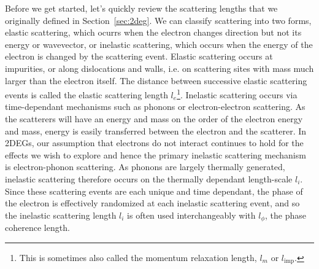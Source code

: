 Before we get started, let's quickly review the scattering lengths that we originally defined in Section~\ref{sec:2deg}. We can classify
scattering into two forms, elastic scattering, which ocurrs when the electron changes direction but not its energy or wavevector, or
inelastic scattering, which occurs when the energy of the electron is changed by the scattering event. Elastic scattering occurs at impurities, or along dislocations
and walls, i.e. on scattering sites with mass much larger than the electron itself. The distance between successive elastic scattering events is
called the elastic scattering length $l_e$\footnote{This is sometimes also called the momentum relaxation length, $l_m$ or $l_{\textrm{imp}}$.}.
Inelastic scattering occurs via time-dependant mechanisms such as phonons or electron-electron scattering. As the scatterers will have an energy and
mass on the order of the electron energy and mass, energy is easily transferred between the electron and the scatterer. In 2DEGs, our assumption that
electrons do not interact continues to hold for the effects we wish to explore and hence the primary inelastic scattering mechanism is electron-phonon scattering.
As phonons are largely thermally generated, inelastic scattering therefore occurs on the thermally dependant length-scale $l_i$. Since these scattering events
are each unique and time dependant, the phase of the electron is effectively randomized at each inelastic scattering event, and so
the inelastic scattering length $l_i$ is often used interchangeably with $l_\phi$, the phase coherence length.

